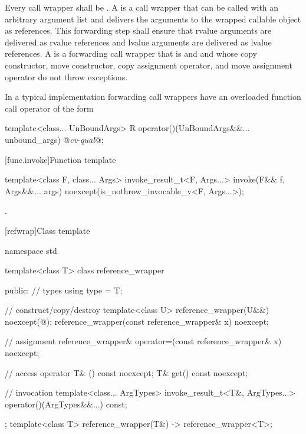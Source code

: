 \pnum
{}%
%
%
Every call wrapper shall be
.
A  is a
call wrapper that can be called with an arbitrary argument list
and delivers the arguments to the wrapped callable object as references.
This forwarding step shall ensure that rvalue arguments are delivered as rvalue references
and lvalue arguments are delivered as lvalue references.
A  is a forwarding call wrapper that is
 and  and
whose copy constructor, move constructor, copy assignment operator,
and move assignment operator do not throw exceptions.
\begin{note}
In a typical implementation
forwarding call wrappers have an overloaded function call
operator of
the form
\begin{codeblock}
template<class... UnBoundArgs>
  R operator()(UnBoundArgs&&... unbound_args) @\textit{cv-qual}@;
\end{codeblock}
\end{note}

[func.invoke]{Function template }
%
%
\begin{itemdecl}
template<class F, class... Args>
  invoke_result_t<F, Args...> invoke(F&& f, Args&&... args)
    noexcept(is_nothrow_invocable_v<F, Args...>);
\end{itemdecl}

\begin{itemdescr}
\pnum
\returns
{}.
\end{itemdescr}

[refwrap]{Class template }

%
%
\begin{codeblock}
namespace std {
  template<class T> class reference_wrapper {
  public:
    // types
    using type = T;

    // construct/copy/destroy
    template<class U>
      reference_wrapper(U&&) noexcept(@\seebelow@);
    reference_wrapper(const reference_wrapper& x) noexcept;

    // assignment
    reference_wrapper& operator=(const reference_wrapper& x) noexcept;

    // access
    operator T& () const noexcept;
    T& get() const noexcept;

    // invocation
    template<class... ArgTypes>
      invoke_result_t<T&, ArgTypes...> operator()(ArgTypes&&...) const;
  };
  template<class T>
    reference_wrapper(T&) -> reference_wrapper<T>;
}
\end{codeblock}

